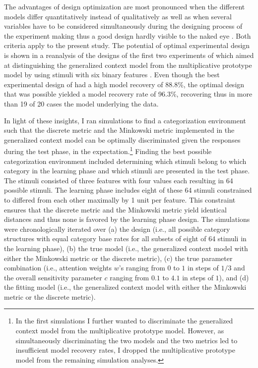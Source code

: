 \documentclass[a4paper,man,natbib]{apa6}
\begin{document}
The advantages of design optimization are most pronounced when the different models differ quantitatively instead of qualitatively as well as when several variables have to be considered simultaneously during the designing process of the experiment making thus a good design hardly visible to the naked eye \citep{myung2009optimal}. Both criteria apply to the present study.
The potential of optimal experimental design is shown in a reanalysis of the designs of the first two experiments of \cite{smith1998prototypes} which aimed at distinguishing the generalized context model \citep{nosofsky1986attention} from the multiplicative prototype model \citep{smith1998prototypes} by using stimuli with six binary features \citep{myung2009optimal}. Even though the best experimental design of \citeauthor{smith1998prototypes} had a high model recovery of 88.8\%, the optimal design that was possible yielded a model recovery rate of 96.3\%, recovering thus in more than 19 of 20 cases the model underlying the data.  

In light of these insights, I ran simulations to find a categorization environment such that the discrete metric and the Minkowski metric implemented in the generalized context model can be optimally discriminated given the responses during the test phase, in the expectation.\footnote{In the first simulations I further wanted to discriminate the generalized context model from the multiplicative prototype model. However, as simultaneously discriminating the two models and the two metrics led to insufficient model recovery rates, I dropped the multiplicative prototype model from the remaining simulation analyses.} Finding the best possible categorization environment included determining which stimuli belong to which category in the learning phase and which stimuli are presented in the test phase. The stimuli consisted of three features with four values each resulting in 64 possible stimuli. The learning phase includes eight of these 64 stimuli constrained to differed from each other maximally by 1 unit per feature. This constraint ensures that the discrete metric and the Minkowski metric yield identical distances and thus none is favored by the learning phase design. The simulations were chronologically iterated over (a) the design (i.e., all possible category structures with equal category base rates for all subsets of eight of 64 stimuli in the learning phase), (b) the true model (i.e., the generalized context model with either the Minkowski metric or the discrete metric), (c) the true parameter combination (i.e., attention weights $w$'s ranging from $0$ to $1$ in steps of $1/3$ and the overall sensitivity parameter $c$ ranging from $0.1$ to $4.1$ in steps of $1$), and (d) the fitting model (i.e., the generalized context model with either the Minkowski metric or the discrete metric).
\end{document}
